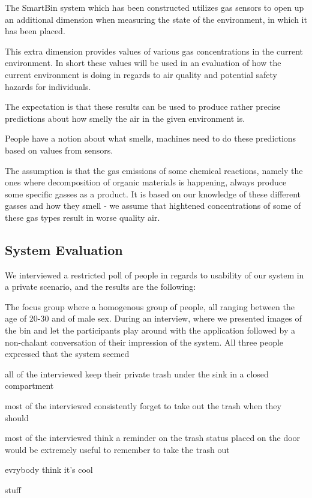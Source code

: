The SmartBin system which has been constructed utilizes gas sensors to open up an additional dimension when measuring the state of the environment, in which it has been placed.

This extra dimension provides values of various gas concentrations in the current environment.
In short these values will be used in an evaluation of how the current environment is doing in regards to air quality and potential safety hazards for individuals.

The expectation is that these results can be used to produce rather precise predictions about how smelly the air in the given environment is.

People have a notion about what smells, machines need to do these predictions based on values from sensors.

The assumption is that the gas emissions of some chemical reactions, namely the ones where decomposition of organic materials is happening, always produce some specific gasses as a product.
It is based on our knowledge of these different gasses and how they smell - we assume that hightened concentrations of some of these gas types result in worse quality air.


\subsection{System Evaluation}

We interviewed a restricted poll of people in regards to usability of our system in a private scenario, and the results are the following:

The focus group where a homogenous group of people, all ranging between the age of 20-30 and of male sex.
During an interview, where we presented images of the bin and let the participants play around with the application followed by a non-chalant conversation of their impression of the system.
All three people expressed that the system seemed 

all of the interviewed keep their private trash under the sink in a closed compartment

most of the interviewed consistently forget to take out the trash when they should

most of the interviewed think a reminder on the trash status placed on the door would be extremely useful to remember to take the trash out

evrybody think it's cool

stuff
